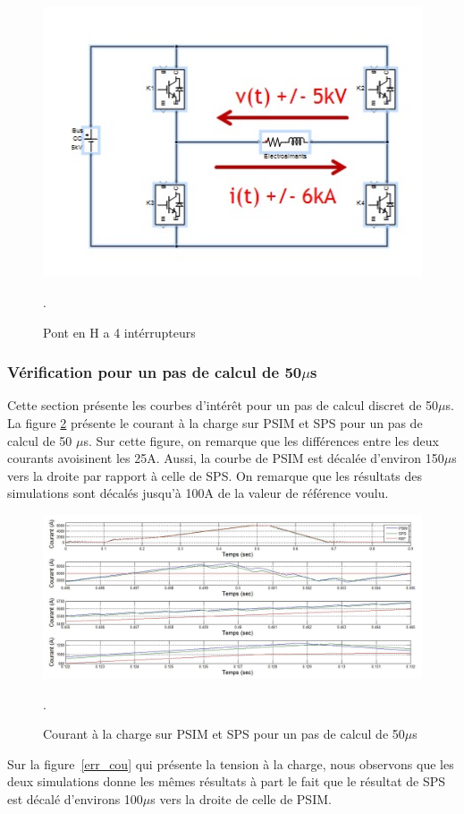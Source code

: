 \documentclass[11pt,letterpaper,final]{report}
\begin{document}
\begin{figure}[htb]
\centering
\includegraphics[scale=1]{Fig/Hacheur4Quadrants/Hacheur.jpg}
\caption{Pont en H a 4 intérrupteurs}.
\label{hach}
\end{figure}

\subsubsection{Vérification pour un pas de calcul de 50$\mu$s}
Cette section présente les courbes d'intérêt pour un pas de calcul discret de 50$\mu$s. La figure \ref{comp_PSIM_SPS} présente le courant à la charge sur PSIM et SPS pour un pas de calcul de 50 $\mu$s. Sur cette figure, on remarque que les différences entre les deux courants avoisinent les 25A. Aussi, la courbe de PSIM est décalée d'environ 150$\mu$s vers la droite par rapport à celle de SPS. On remarque que les résultats des simulations sont décalés jusqu'à 100A de la valeur de référence voulu. 

\begin{figure}[htb]
\centering
\includegraphics[scale=0.5]{Fig/Hacheur4Quadrants/HacheurCourantCharge50u.jpg}
\caption{Courant à la charge sur PSIM et SPS pour un pas de calcul de 50$\mu$s}.
\label{comp_PSIM_SPS}
\end{figure}
Sur la figure~\ref{err_cou} qui présente la tension à la charge, nous observons que les deux simulations donne les mêmes résultats à part le fait que le résultat de SPS est décalé d'environs 100$\mu$s vers la droite de celle de PSIM.
\end{document}
